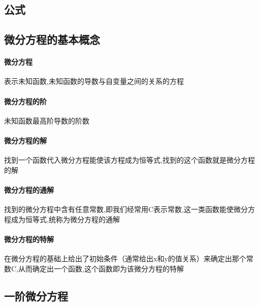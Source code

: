 \documentclass{article}
\begin{document}
\begin{flushleft}
	\LARGE
	
	\section{公式}
	
	\subsection{微分方程的基本概念}
	
	\paragraph{微分方程}
	表示未知函数,未知函数的导数与自变量之间的关系的方程\\
	\paragraph{微分方程的阶}
	未知函数最高阶导数的阶数\\
	\paragraph{微分方程的解}
	找到一个函数代入微分方程能使该方程成为恒等式,找到的这个函数就是微分方程的解\\
	\paragraph{微分方程的通解}
	找到的微分方程中含有任意常数,即我们经常用C表示常数,这一类函数能使微分方程成为恒等式,统称为微分方程的通解\\
	\paragraph{微分方程的特解}
	在微分方程的基础上给出了初始条件（通常给出x和y的值关系）来确定出那个常数C,从而确定出一个函数,这个函数即为该微分方程的特解\\
	
	\subsection{一阶微分方程}
	
	
\end{flushleft}
\end{document}
